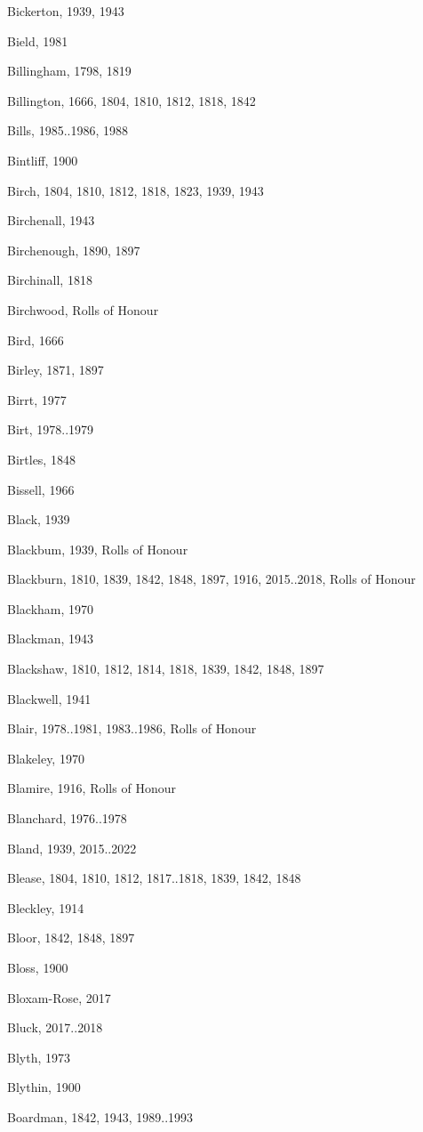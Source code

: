 \begin{theindex}
\item Bickerton, 1939, 1943
\item Bield, 1981
\item Billingham, 1798, 1819
\item Billington, 1666, 1804, 1810, 1812, 1818, 1842
\item Bills, 1985..1986, 1988
\item Bintliff, 1900
\item Birch, 1804, 1810, 1812, 1818, 1823, 1939, 1943
\item Birchenall, 1943
\item Birchenough, 1890, 1897
\item Birchinall, 1818
\item Birchwood, Rolls of Honour
\item Bird, 1666
\item Birley, 1871, 1897
\item Birrt, 1977
\item Birt, 1978..1979
\item Birtles, 1848
\item Bissell, 1966
\item Black, 1939
\item Blackbum, 1939, Rolls of Honour
\item Blackburn, 1810, 1839, 1842, 1848, 1897, 1916, 2015..2018, Rolls of Honour
\item Blackham, 1970
\item Blackman, 1943
\item Blackshaw, 1810, 1812, 1814, 1818, 1839, 1842, 1848, 1897
\item Blackwell, 1941
\item Blair, 1978..1981, 1983..1986, Rolls of Honour
\item Blakeley, 1970
\item Blamire, 1916, Rolls of Honour
\item Blanchard, 1976..1978
\item Bland, 1939, 2015..2022
\item Blease, 1804, 1810, 1812, 1817..1818, 1839, 1842, 1848
\item Bleckley, 1914
\item Bloor, 1842, 1848, 1897
\item Bloss, 1900
\item Bloxam-Rose, 2017
\item Bluck, 2017..2018
\item Blyth, 1973
\item Blythin, 1900
\item Boardman, 1842, 1943, 1989..1993

\end{theindex}
